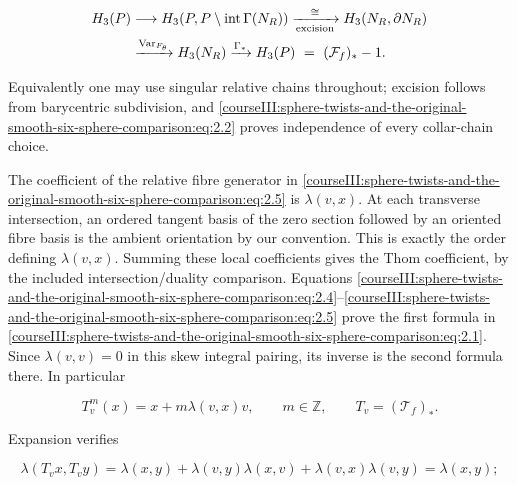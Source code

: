 \begin{equation}
\begin{split}
 H_3(P)&\longrightarrow H_3(P,P\setminus\operatorname{int}\Gamma(N_R))
        \xrightarrow[\rm excision]{\ \cong\ }H_3(N_R,\partial N_R)\\
 &\xrightarrow{\operatorname{Var}_{F_\theta}}H_3(N_R)
        \xrightarrow{\Gamma_*}H_3(P)
        \ =\ (\mathcal F_f)_*-1 .
 \end{split}
 \label{courseIII:sphere-twists-and-the-original-smooth-six-sphere-comparison:eq:2.5}
\end{equation}

Equivalently one may use singular relative chains throughout; excision follows from barycentric subdivision, and \eqref{courseIII:sphere-twists-and-the-original-smooth-six-sphere-comparison:eq:2.2} proves independence of every collar-chain choice.

The coefficient of the relative fibre generator in \eqref{courseIII:sphere-twists-and-the-original-smooth-six-sphere-comparison:eq:2.5} is \(\lambda(v,x)\). At each transverse intersection, an ordered tangent basis of the zero section followed by an oriented fibre basis is the ambient orientation by our convention. This is exactly the order defining \(\lambda(v,x)\). Summing these local coefficients gives the Thom coefficient, by the included intersection/duality comparison. Equations \eqref{courseIII:sphere-twists-and-the-original-smooth-six-sphere-comparison:eq:2.4}--\eqref{courseIII:sphere-twists-and-the-original-smooth-six-sphere-comparison:eq:2.5} prove the first formula in \eqref{courseIII:sphere-twists-and-the-original-smooth-six-sphere-comparison:eq:2.1}. Since \(\lambda(v,v)=0\) in this skew integral pairing, its inverse is the second formula there. In particular

\begin{equation}
T_v^m(x)=x+m\lambda(v,x)v,\qquad
           m\in\mathbb Z,\qquad T_v=(\mathcal T_f)_* .
 \label{courseIII:sphere-twists-and-the-original-smooth-six-sphere-comparison:eq:2.6}
\end{equation}

Expansion verifies

\begin{equation}
\lambda(T_vx,T_vy)
  =\lambda(x,y)+\lambda(v,y)\lambda(x,v)
                     +\lambda(v,x)\lambda(v,y)=\lambda(x,y);
 \label{courseIII:sphere-twists-and-the-original-smooth-six-sphere-comparison:eq:2.7}
\end{equation}

